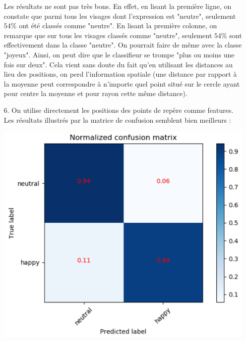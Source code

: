 \documentclass[a4paper, 10pt]{article}
\begin{document}
\begin{itemize}
\hspace*{2mm}	
	
Les résultats ne sont pas très bons. En effet, en lisant la première ligne, on constate que parmi tous les visages dont l'expression est "neutre", seulement $54\%$ ont été classés comme "neutre". En lisant la première colonne, on remarque que sur tous les visages classés comme "neutre", seulement $54\%$ sont effectivement dans la classe "neutre". On pourrait faire de même avec la classe "joyeux". Ainsi, on peut dire que le classifieur se trompe "plus ou moins une fois sur deux". Cela vient sans doute du fait qu'en utilisant les distances au lieu des positions, on perd l'information spatiale (une distance par rapport à la moyenne peut correspondre à n'importe quel point situé sur le cercle ayant pour centre la moyenne et pour rayon cette même distance). \\
	
	\item[6.] On utilise directement les positions des points de repère comme features. Les résultats illustrés par la matrice de confusion semblent bien meilleurs : \\
	
\begin{center}
	\includegraphics[scale=0.7]{confusion_matrix_positions.PNG}
\end{center}	
	
\hspace*{2mm}	
	

\end{itemize}
\end{document}
